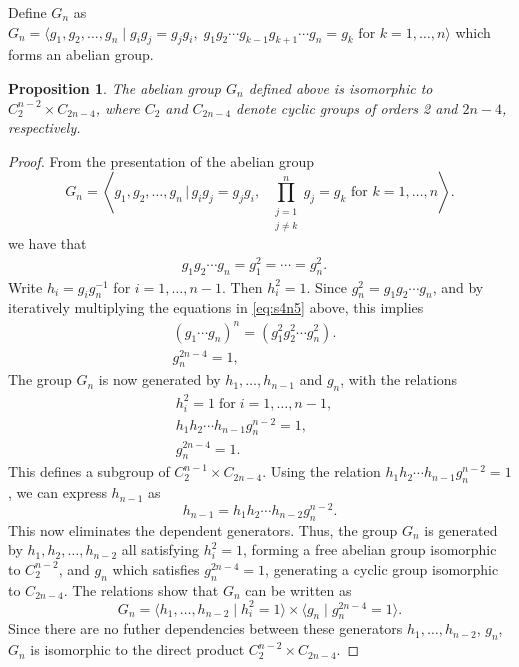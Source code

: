 \documentclass[11pt]{amsart}
\theoremstyle{plain}
\newtheorem{prop}[theorem]{Proposition}
\theoremstyle{definition}
\theoremstyle{remark}
\begin{document}
Define \( G_n \) as \( G_n = \langle g_1, g_2, \dots, g_n \mid g_i g_j = g_j g_i, \; g_1 g_2 \cdots g_{k-1} g_{k+1} \cdots g_n = g_k \text{ for } k=1,\dots,n \rangle \) which forms an abelian group.

\begin{prop}
	\label{prop:structure_Gn}
	The abelian group \(G_n\) defined above is isomorphic to \(C_2^{n-2} \times C_{2n-4}\), where \( C_2 \) and \(C_{2n-4}\) denote cyclic groups of orders 2 and \(2n-4\), respectively.
\end{prop}

\begin{proof}
	From the presentation of the abelian group 
	\[
	G_n = \left\langle g_1, g_2, \dots, g_n \,\Bigg|\, g_i g_j = g_j g_i, \;\; \prod_{\substack{j=1 \\ j \neq k}}^n g_j = g_k \text{ for } k=1,\dots,n \right\rangle.
	\]
	we have that	
	\begin{align}
	\label{eq:s4n5}
	g_1 g_2 \cdots g_{n} = g_{1}^2 = \cdots = g_n^2. & 
	\end{align}
	 Write \( h_i = g_ig_n^{-1} \) for \( i = 1, \dots, n-1\). Then \( h_i^2 = 1 \). Since \(g_n^2 = g_1g_2\cdots g_{n}\), and by iteratively multiplying the equations in \eqref{eq:s4n5} above, this implies
	\[
	\begin{array}{ll}
	(g_1\cdots g_n)^n = (g_1^2 g_2^2 \cdots g_{n}^2). & \\ g_n^{2n-4} = 1, &	
	\end{array}
	\] The group \( G_n \) is now generated by \(h_1, \dots, h_{n-1}\) and \(g_n\), with the relations
	\[
	\begin{array}{ll}
	h_i^2 = 1 \; \text{for}\; i= 1, \dots, n-1, & \\
	h_1h_2\cdots h_{n-1}g_n^{n-2} = 1, & \\	
	g_n^{2n-4} = 1. & 	
	\end{array}
	\] This defines a subgroup of \( C_2^{n-1} \times C_{2n-4} \). Using the relation \( h_1h_2\cdots h_{n-1}g_n^{n-2} = 1 \), we can express \( h_{n-1}\) as	
	\[h_{n-1} = h_1 h_2 \cdots h_{n-2} g_n^{n-2}.\]
	This now eliminates the dependent generators. Thus, the group \( G_n\) is generated by \( h_1, h_2, \dots, h_{n-2} \) all satisfying \(h_i^2 = 1 \), forming a free abelian group isomorphic to \( C_2^{n-2} \), and \( g_n \) which satisfies \( g_n^{2n-4} = 1 \), generating a cyclic group isomorphic to \( C_{2n-4} \). The relations show that \(G_n\) can be written as \[ G_n = \langle h_1, \dots, h_{n-2} \mid h_i^2 = 1 \rangle \times \langle g_n \mid g_n^{2n-4} = 1 \rangle. \] Since there are no futher dependencies between these generators \( h_1, \dots, h_{n-2} \), \( g_n \), \( G_n\) is isomorphic to the direct product \(C_2^{n-2} \times C_{2n-4}\).
	
\end{proof}
\end{document}
